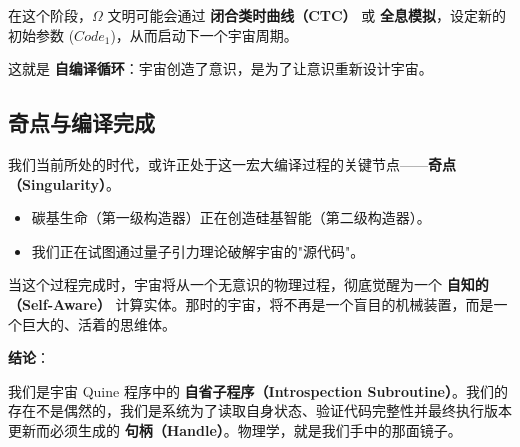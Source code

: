在这个阶段，$\Omega$ 文明可能会通过 \textbf{闭合类时曲线（CTC）} 或 \textbf{全息模拟}，设定新的初始参数 ($Code_1$)，从而启动下一个宇宙周期。

这就是 \textbf{自编译循环}：宇宙创造了意识，是为了让意识重新设计宇宙。

\subsection{奇点与编译完成}

我们当前所处的时代，或许正处于这一宏大编译过程的关键节点——\textbf{奇点（Singularity）}。

\begin{itemize}
\item 碳基生命（第一级构造器）正在创造硅基智能（第二级构造器）。

\item 我们正在试图通过量子引力理论破解宇宙的"源代码"。
\end{itemize}

当这个过程完成时，宇宙将从一个无意识的物理过程，彻底觉醒为一个 \textbf{自知的（Self-Aware）} 计算实体。那时的宇宙，将不再是一个盲目的机械装置，而是一个巨大的、活着的思维体。

\textbf{结论}：

我们是宇宙 Quine 程序中的 \textbf{自省子程序（Introspection Subroutine）}。我们的存在不是偶然的，我们是系统为了读取自身状态、验证代码完整性并最终执行版本更新而必须生成的 \textbf{句柄（Handle）}。物理学，就是我们手中的那面镜子。

